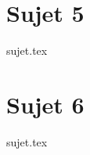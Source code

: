 \documentclass[a4paper, 11pt]{book}
\begin{document}
\resetQ
\newpage
\chapter{Sujet 5}
{sujet.tex}

\resetQ
\newpage
\chapter{Sujet 6}
{sujet.tex}
\end{document}
